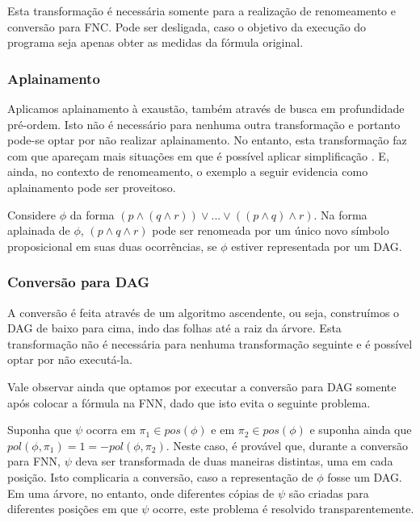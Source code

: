 Esta transformação é necessária somente para a realização de renomeamento e conversão para FNC. Pode ser desligada, caso o objetivo da execução do programa seja apenas obter as medidas da fórmula original.

\subsubsection{Aplainamento}

\indent

Aplicamos aplainamento à exaustão, também através de busca em profundidade pré-ordem. Isto não é necessário para nenhuma outra transformação e portanto pode-se optar por não realizar aplainamento. No entanto, esta transformação faz com que apareçam mais situações em que é possível aplicar simplificação \cite{sebastiani2009automated}. E, ainda, no contexto de renomeamento, o exemplo a seguir evidencia como aplainamento pode ser proveitoso.

Considere $\phi$ da forma $(p \wedge (q \wedge r)) \vee ... \vee ((p \wedge q) \wedge r)$. Na forma aplainada de $\phi$, $(p \wedge q \wedge r)$ pode ser renomeada por um único novo símbolo proposicional em suas duas ocorrências, se $\phi$ estiver representada por um DAG.

\subsubsection{Conversão para DAG}

\indent

A conversão é feita através de um algoritmo ascendente, ou seja, construímos o DAG de baixo para cima, indo das folhas até a raiz da árvore. Esta transformação não é necessária para nenhuma transformação seguinte e é possível optar por não executá-la.

Vale observar ainda que optamos por executar a conversão para DAG somente após colocar a fórmula na FNN, dado que isto evita o seguinte problema.

Suponha que $\psi$ ocorra em $\pi_1 \in pos(\phi)$ e em $\pi_2 \in pos(\phi)$ e suponha ainda que $pol(\phi,\pi_1) = 1 = -pol(\phi,\pi_2)$. Neste caso, é provável que, durante a conversão para FNN, $\psi$ deva ser transformada de duas maneiras distintas, uma em cada posição. Isto complicaria a conversão, caso a representação de $\phi$ fosse um DAG. Em uma árvore, no entanto, onde diferentes cópias de $\psi$ são criadas para diferentes posições em que $\psi$ ocorre, este problema é resolvido transparentemente.


